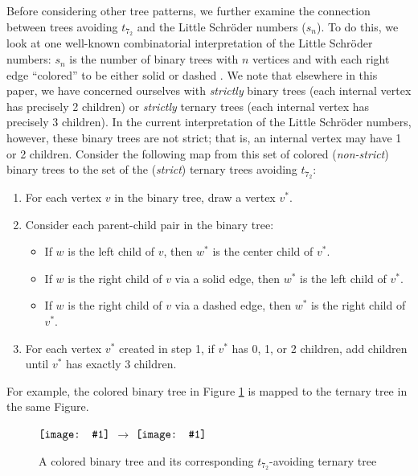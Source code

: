 \documentclass[12pt]{article}
\newcommand{\vcentergraphics}[1]{\ensuremath{\vcenter{\hbox{\texttt{[image: \#1]}}}}}
\begin{document}
Before considering other tree patterns, we further examine the connection between trees avoiding $t_{7_2}$ and the Little Schr\"{o}der numbers ($s_n$).  To do this, we look at one well-known combinatorial interpretation of the Little Schr\"{o}der numbers: $s_n$ is the number of binary trees with $n$ vertices and with each right edge ``colored'' to be either solid or dashed \cite{Stanley99}.  We note that elsewhere in this paper, we have concerned ourselves with \emph{strictly} binary trees (each internal vertex has precisely 2 children) or \emph{strictly} ternary trees (each internal vertex has precisely 3 children).  In the current interpretation of the Little Schr\"{o}der numbers, however, these binary trees are not strict; that is, an internal vertex may have 1 or 2 children.  Consider the following map  from this set of colored (\emph{non-strict}) binary trees to the set of the (\emph{strict}) ternary trees avoiding $t_{7_2}$:

\begin{enumerate}
\item For each vertex $v$ in the binary tree, draw a vertex $v^*$.
\item Consider each parent-child pair in the binary tree:
\begin{itemize}
\item If $w$ is the left child of $v$, then  $w^*$ is the center child of $v^*$.
\item If $w$ is the right child of $v$ via a solid edge, then $w^*$ is the left child of $v^*$.
\item If $w$ is the right child of $v$ via a dashed edge, then $w^*$ is the right child of $v^*$.
\end{itemize}
\item For each vertex $v^*$ created in step 1, if $v^*$ has 0, 1, or 2 children, add children until $v^*$ has exactly 3 children.
\end{enumerate}

For example, the colored binary tree in Figure \ref{Fi:schroder} is mapped to the ternary tree in the same Figure.

\begin{figure}[bht]
\begin{center}
\vcentergraphics{Schroeder_tree-binary} \hspace{.4in} $\rightarrow$ \hspace{.4in} \vcentergraphics{Schroeder_tree}
\end{center}
\caption{A colored binary tree and its corresponding $t_{7_2}$-avoiding ternary tree}
\label{Fi:schroder}
\end{figure}
\end{document}
